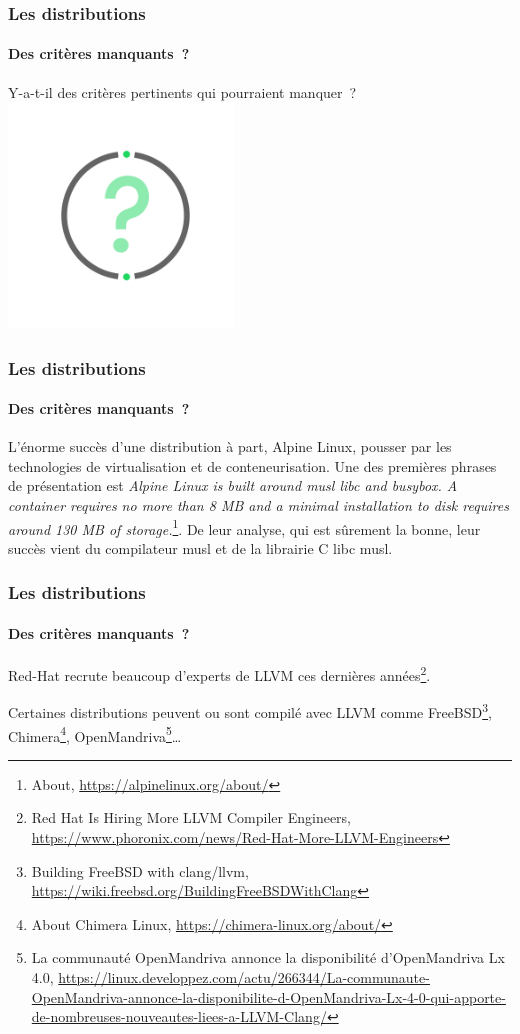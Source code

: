 \documentclass{beamer}
\begin{document}
    \begin{frame}
        \transdissolve
        \frametitle{Les distributions}
        \framesubtitle{Des critères manquants~?}
        Y-a-t-il des critères pertinents qui pourraient manquer~?
        \bigbreak
        \centering
        \includegraphics[width=6cm]{image/question-mark}
    \end{frame}

    \begin{frame}
        \transdissolve
        \frametitle{Les distributions}
        \framesubtitle{Des critères manquants~?}
        L'énorme succès d'une distribution à part, Alpine Linux, pousser par les technologies de virtualisation et de conteneurisation.
        \bigbreak
        Une des premières phrases de présentation est \textit{Alpine Linux is built around musl libc and busybox. A container requires no more than 8 MB and a minimal installation to disk requires around 130 MB of storage.}\footnote{About, \url{https://alpinelinux.org/about/}}.
        \bigbreak
        De leur analyse, qui est sûrement la bonne, leur succès vient du compilateur musl et de la librairie C libc musl.
    \end{frame}

    \begin{frame}
        \transdissolve
        \frametitle{Les distributions}
        \framesubtitle{Des critères manquants~?}
        Red-Hat recrute beaucoup d'experts de LLVM ces dernières années\footnote{Red Hat Is Hiring More LLVM Compiler Engineers, \url{https://www.phoronix.com/news/Red-Hat-More-LLVM-Engineers}}.

        Certaines distributions peuvent ou sont compilé avec LLVM comme FreeBSD\footnote{Building FreeBSD with clang/llvm, \url{https://wiki.freebsd.org/BuildingFreeBSDWithClang}}, Chimera\footnote{About Chimera Linux, \url{https://chimera-linux.org/about/}}, OpenMandriva\footnote{La communauté OpenMandriva annonce la disponibilité d'OpenMandriva Lx 4.0, \url{https://linux.developpez.com/actu/266344/La-communaute-OpenMandriva-annonce-la-disponibilite-d-OpenMandriva-Lx-4-0-qui-apporte-de-nombreuses-nouveautes-liees-a-LLVM-Clang/}}\ldots
    \end{frame}
\end{document}
